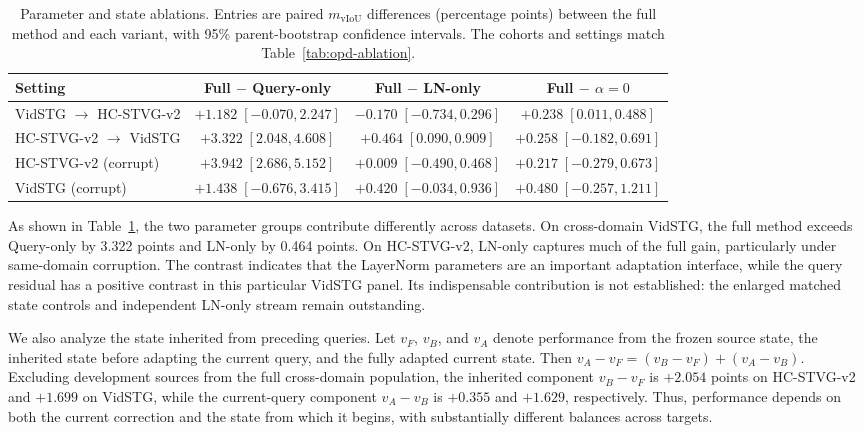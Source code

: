 \documentclass[10pt,twocolumn,letterpaper]{article}
\newcommand{\mvIoU}{\ensuremath{m_{\mathrm{vIoU}}}}
\begin{document}
\begin{table}[t]
	\centering
	\caption{Parameter and state ablations. Entries are paired
		\mvIoU{} differences (percentage points) between the full
		method and each variant, with 95\% parent-bootstrap
		confidence intervals. The cohorts and settings match
		Table~\ref{tab:opd-ablation}.}
	\label{tab:state-ablation}
	\setlength{\tabcolsep}{6pt}
	\small
	\begin{tabular}{lccc}
		\toprule
		Setting & Full $-$ Query-only & Full $-$ LN-only & Full $-$ $\alpha=0$ \\
		\midrule
		VidSTG $\rightarrow$ HC-STVG-v2
		& $+1.182\;[-0.070,2.247]$ & $-0.170\;[-0.734,0.296]$ & $+0.238\;[0.011,0.488]$ \\
		HC-STVG-v2 $\rightarrow$ VidSTG
		& $+3.322\;[2.048,4.608]$ & $+0.464\;[0.090,0.909]$ & $+0.258\;[-0.182,0.691]$ \\
		HC-STVG-v2 (corrupt)
		& $+3.942\;[2.686,5.152]$ & $+0.009\;[-0.490,0.468]$ & $+0.217\;[-0.279,0.673]$ \\
		VidSTG (corrupt)
		& $+1.438\;[-0.676,3.415]$ & $+0.420\;[-0.034,0.936]$ & $+0.480\;[-0.257,1.211]$ \\
		\bottomrule
	\end{tabular}
\end{table}

As shown in Table~\ref{tab:state-ablation}, the two
parameter groups contribute differently across datasets.
On cross-domain VidSTG, the full method exceeds Query-only
by 3.322 points and LN-only by 0.464 points. On
HC-STVG-v2, LN-only captures much of the full gain,
particularly under same-domain corruption. The contrast
indicates that the LayerNorm parameters are an important
adaptation interface, while the query residual has a positive contrast in this particular
VidSTG panel. Its indispensable contribution is not established: the enlarged
matched state controls and independent LN-only stream remain outstanding.

We also analyze the state inherited from preceding queries.
Let $v_F$, $v_B$, and $v_A$ denote performance from the
frozen source state, the inherited state before adapting
the current query, and the fully adapted current state.
Then $v_A-v_F=(v_B-v_F)+(v_A-v_B)$. Excluding development
sources from the full cross-domain population, the inherited
component $v_B-v_F$ is $+2.054$ points on HC-STVG-v2
and $+1.699$ on VidSTG, while the current-query component
$v_A-v_B$ is $+0.355$ and $+1.629$, respectively. Thus,
performance depends on both the current correction and
the state from which it begins, with substantially different
balances across targets.
\end{document}
